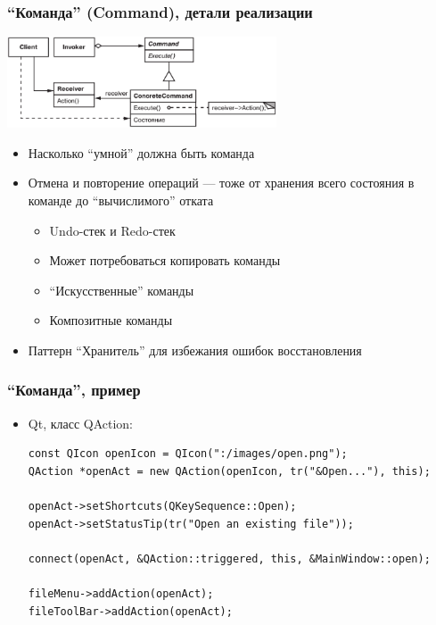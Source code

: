 \documentclass[xetex,mathserif,serif]{beamer}
\begin{document}
	\begin{frame}
		\frametitle{``Команда'' (Command), детали реализации}
		\begin{center}
			\includegraphics[width=0.6\textwidth]{command.png}
		\end{center}
		\begin{itemize}
			\item Насколько ``умной'' должна быть команда
			\item Отмена и повторение операций --- тоже от хранения всего состояния в команде до ``вычислимого'' отката
			\begin{itemize}
				\item Undo-стек и Redo-стек
				\item Может потребоваться копировать команды
				\item ``Искусственные'' команды
				\item Композитные команды
			\end{itemize}
			\item Паттерн ``Хранитель'' для избежания ошибок восстановления
		\end{itemize}
	\end{frame}

	\begin{frame}[fragile]
		\frametitle{``Команда'', пример}
		\begin{itemize}
			\item Qt, класс QAction:
			\begin{verbatim}
const QIcon openIcon = QIcon(":/images/open.png");
QAction *openAct = new QAction(openIcon, tr("&Open..."), this);

openAct->setShortcuts(QKeySequence::Open);
openAct->setStatusTip(tr("Open an existing file"));

connect(openAct, &QAction::triggered, this, &MainWindow::open);

fileMenu->addAction(openAct);
fileToolBar->addAction(openAct);
			\end{verbatim}
		\end{itemize}
\end{frame}
\end{document}
